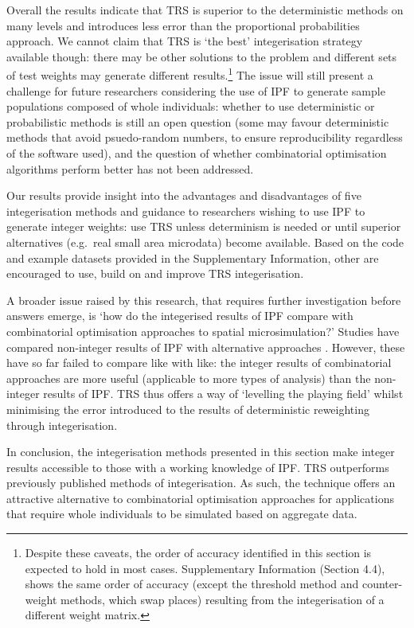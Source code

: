 Overall the results indicate that TRS is superior to the
deterministic methods on many levels and introduces less error than the
proportional probabilities approach.
We cannot claim that TRS is `the best' integerisation strategy available though:
there may be other solutions to the problem and different sets of test weights
may generate different
results.\footnote{Despite these caveats, the order of accuracy
identified in this section is expected to hold in most cases.
Supplementary Information (Section 4.4), shows the same order of
accuracy (except the threshold method and counter-weight
methods, which swap places) resulting from the integerisation of a
different weight matrix.
}
The issue will still present a
challenge for future researchers considering the use of IPF to generate sample
populations composed of whole individuals: whether to use deterministic or
probabilistic methods is still an open question (some may favour
deterministic methods that avoid psuedo-random numbers, to ensure
reproducibility regardless of the software used), and the question of whether
combinatorial optimisation algorithms perform better has not been addressed.

Our results provide insight into the advantages and disadvantages of
five integerisation methods and guidance to researchers wishing to
use IPF to generate integer weights: use
TRS unless determinism is needed or until superior alternatives (e.g.~real small
area microdata) become available. Based on the code and example datasets
provided in the Supplementary Information, other are encouraged to use, build on
and improve TRS integerisation.

A broader issue raised by this research, that requires further
investigation before answers emerge, is `how do the integerised results of IPF
compare with combinatorial optimisation approaches to spatial microsimulation?'
Studies have compared non-integer results of IPF with
alternative approaches \citep{Smith2009, Ryan2009, Rahman2010, harland2012}.
However, these have so far failed to compare like with like: the integer results
of combinatorial approaches are more useful (applicable to more types of
analysis) than the non-integer results of IPF. TRS thus offers a
way of `levelling the playing field' whilst minimising the error introduced to
the results of deterministic reweighting through integerisation.

In conclusion, the integerisation methods presented in this section make
integer results accessible to those with a working knowledge of IPF. TRS
outperforms previously published methods of integerisation. As such, the
technique offers an attractive alternative to combinatorial
optimisation approaches for applications that
require whole individuals to be simulated based on aggregate data.

